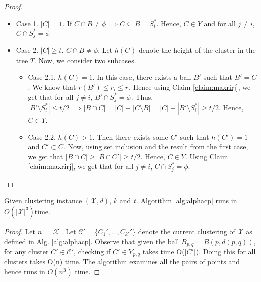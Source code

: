\documentclass[11pt]{article}
\newcommand{\mc}{\mathcal}
\begin{document}
\begin{proof}
\begin{itemize}[nolistsep]
\item Case 1. $|C| = 1$. If $C \cap B \neq \phi \implies C \subseteq B = S_i^*$. Hence, $C \in Y$ and for all $j \neq i$, $C \cap S_j^* = \phi$

\item Case 2. $|C|\ge t$. $C \cap B \neq \phi$. Let $h(C)$ denote the height of the cluster in the tree $T$. Now, we consider two subcases.
\begin{itemize}
\renewcommand\labelitemii{$\circ$}
\item Case 2.1. $h(C) = 1$. In this case, there exists a ball $B'$ such that $B' = C$. We know that $r(B') \le r_i \le r$. Hence using Claim \ref{claim:maxrirj}, we get that for all $j \neq i$, $B' \cap S_j^* = \phi$. Thus, $|B'\setminus S_i^*| \le t/2 \implies |B\cap C| = |C| - |C\setminus B| = |C| - |B'\setminus S_i^*| \ge t/2$. Hence, $C \in Y$.

\item Case 2.2. $h(C) > 1$. Then there exists some $C'$ such that $h(C') = 1$ and $C' \subset C$. Now, using set inclusion and the result from the first case, we get that $|B\cap C| \ge |B\cap C'| \ge t/2$. Hence, $C \in Y$. Using Claim \ref{claim:maxrirj}, we get that for all $j \neq i$, $C \cap S_j^* = \phi$.
\end{itemize} 
\end{itemize}
\end{proof}

\begin{theorem}
Given clustering instance $(\mc X, d)$, $k$ and $t$. Algorithm \ref{alg:alphacp} runs in $O(|\mc X|^3)$time.
\end{theorem}

\begin{proof}
Let $n = |\mc X|$. Let $\mc C' =\{C_1', \ldots, C_{k'}'\}$ denote the current clustering of $\mc X$ as defined in Alg. \ref{alg:alphacp}. Observe that given the ball $B_{p, q} = B(p, d(p, q))$, for any cluster $C' \in \mc C'$, checking if $C' \in Y_{p, q}$ takes time O($|C'|$). Doing this for all clusters takes O(n) time. The algorithm examines all the pairs of points and hence runs in $O(n^3)$ time.
\end{proof}


\end{document}

